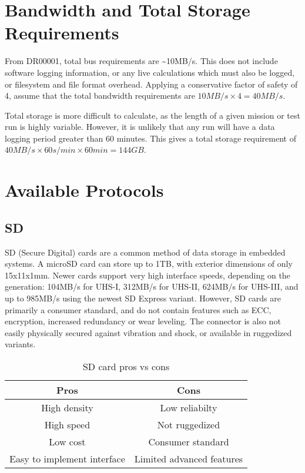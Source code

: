 \documentclass[12pt,article]{memoir}
\begin{document}
\newpage

\chapter{Bandwidth and Total Storage Requirements}
From DR00001, total bus requirements are \textasciitilde 10MB/s. This does not include software logging information, or any live calculations which must also be logged, or filesystem and file format overhead. Applying a conservative factor of safety of 4, assume that the total bandwidth requirements are $10MB/s \times 4 = 40MB/s$.\par
Total storage is more difficult to calculate, as the length of a given mission or test run is highly variable. However, it is unlikely that any run will have a data logging period greater than 60 minutes. This gives a total storage requirement of $40MB/s \times 60s/min \times 60min = 144GB$.
\newpage

\chapter{Available Protocols}
\section{SD}
SD (Secure Digital) cards are a common method of data storage in embedded systems. A microSD card can store up to 1TB, with exterior dimensions of only 15x11x1mm. Newer cards support very high interface speeds, depending on the generation: 104MB/s for UHS-I, 312MB/s for UHS-II, 624MB/s for UHS-III, and up to 985MB/s using the newest SD Express variant. However, SD cards are primarily a consumer standard, and do not contain features such as ECC, encryption, increased redundancy or wear leveling. The connector is also not easily physically secured against vibration and shock, or available in ruggedized variants. \cite{wiki:sdcard}
\begin{table}[H]
	\centering
	\begin{tabu}{c | c}
		Pros & Cons \\ \hline
		High density & Low reliabilty\\
		High speed & Not ruggedized\\
		Low cost & Consumer standard\\
		Easy to implement interface & Limited advanced features\\
	\end{tabu}
	\caption{SD card pros vs cons}
\end{table}
\end{document}
